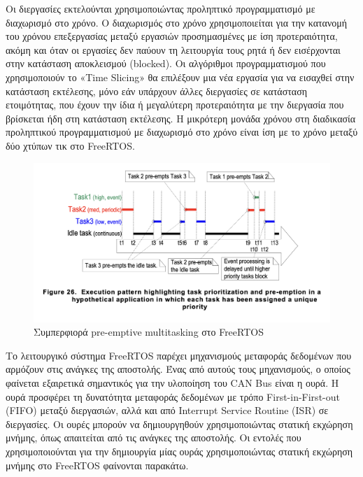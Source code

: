 \documentclass[a4paper,nobib,justified]{tufte-book}
\begin{document}
Οι διεργασίες εκτελούνται χρησιμοποιώντας προληπτικό προγραμματισμό με διαχωρισμό στο χρόνο. Ο διαχωρισμός στο χρόνο χρησιμοποιείται για την κατανομή του χρόνου επεξεργασίας μεταξύ εργασιών προσημασμένες με ίση προτεραιότητα, ακόμη και όταν οι εργασίες δεν παύουν τη λειτουργία τους ρητά ή δεν εισέρχονται στην κατάσταση αποκλεισμού (blocked). Οι αλγόριθμοι προγραμματισμού που χρησιμοποιούν το «Time Slicing» θα επιλέξουν μια νέα εργασία για να εισαχθεί στην κατάσταση εκτέλεσης, μόνο εάν υπάρχουν άλλες διεργασίες σε κατάσταση ετοιμότητας, που έχουν την ίδια ή μεγαλύτερη προτεραιότητα με την διεργασία που βρίσκεται ήδη στη κατάσταση εκτέλεσης. Η μικρότερη μονάδα χρόνου στη διαδικασία προληπτικού προγραμματισμού με διαχωρισμό στο χρόνο είναι ίση με το χρόνο μεταξύ δύο χτύπων τικ στο FreeRTOS.

\begin{figure}[ht]
	\includegraphics{media/diagrams/freeRTOS-preemptive-multitasking.png}
	\caption{Συμπερφιορά pre-emptive multitasking στο FreeRTOS}
	\label{fig:freeRTOS-preemptive-multitasking}
\end{figure}

Το λειτουργικό σύστημα FreeRTOS παρέχει μηχανισμούς μεταφοράς δεδομένων που αρμόζουν στις ανάγκες της αποστολής. Ένας από αυτούς τους μηχανισμούς, ο οποίος φαίνεται εξαιρετικά σημαντικός για την υλοποίηση του CAN Bus είναι η ουρά. Η ουρά προσφέρει τη δυνατότητα μεταφοράς δεδομένων με τρόπο First-in-First-out (FIFO) μεταξύ διεργασιών, αλλά και από Interrupt Service Routine (ISR) σε διεργασίες. Οι ουρές μπορούν να δημιουργηθούν χρησιμοποιώντας στατική εκχώρηση μνήμης, όπως απαιτείται από τις ανάγκες της αποστολής. Οι εντολές που χρησιμοποιούνται για την δημιουργία μίας ουράς χρησιμοποιώντας στατική εκχώρηση μνήμης στο FreeRTOS φαίνονται παρακάτω.
\inputminted{c++}{code/examples/gatekeeper-queue.cpp}
\end{document}
